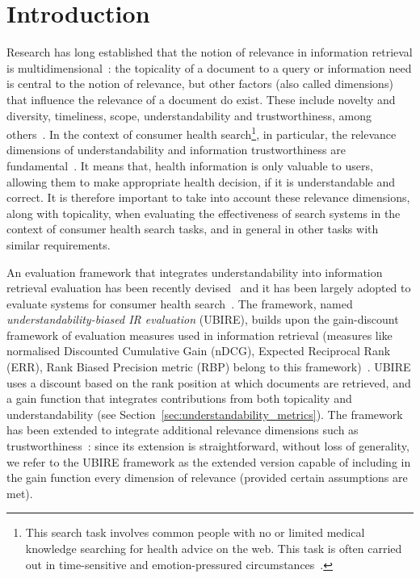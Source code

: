 \section{Introduction}
\label{chp:evaluation_metrics}

Research has long established that the notion of relevance in information retrieval is multidimensional~\cite{schamber94,borlund03}: the topicality of a document to a query or information need is central to the notion of relevance, but other factors (also called dimensions) that influence the relevance of a document do exist. These include novelty and diversity, timeliness, scope, understandability and trustworthiness, among others~\cite{park93,schamber94}. In the context of consumer health search\footnote{This search task involves common people with no or limited medical knowledge searching for health advice on the web. This task is often carried out in time-sensitive and emotion-pressured circumstances~\cite{hersh08,mishra2014time}.}, in particular, the relevance dimensions of understandability and information trustworthiness are fundamental~\cite{hersh08}. 
It means that, health information is only valuable to users, allowing them to make appropriate health decision, if it is understandable and correct. 
It is therefore important to take into account these relevance dimensions, along with topicality, when evaluating the effectiveness of search systems in the context of consumer health search tasks, and in general in other tasks with similar requirements.

An evaluation framework that integrates understandability into information retrieval evaluation has been recently devised~\cite{zuccon14,zuccon16} and it has been largely adopted to evaluate systems for consumer health search~\cite{clefIR15,clefIR16,clefIR17}. The framework, named \textit{understandability-biased IR evaluation} (UBIRE), builds upon the gain-discount framework of evaluation measures used in information retrieval (measures like normalised Discounted Cumulative Gain (nDCG), Expected Reciprocal Rank (ERR), Rank Biased Precision metric (RBP) belong to this framework)~\cite{carterette11}. UBIRE uses a discount based on the rank position at which documents are retrieved, and a gain function that integrates contributions from both topicality and understandability (see Section~\ref{sec:understandability_metrics}). The framework has been extended to integrate additional relevance dimensions such as trustworthiness~\cite{clefIR17}: since its extension is straightforward, without loss of generality, we refer to the UBIRE framework as the extended version capable of including in the gain function every dimension of relevance (provided certain assumptions are met). 

